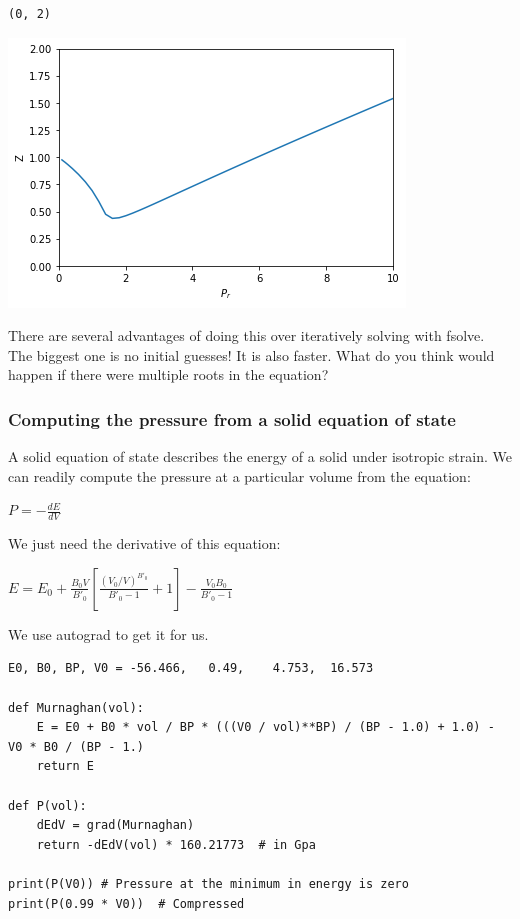 \documentclass[11pt]{article}
\begin{document}
\begin{verbatim}
(0, 2)
\end{verbatim}



\begin{center}
\includegraphics[width=.9\linewidth]{obipy-resources/bedd9c33d1d348d762ec8e845109beab-22007ycS.png}
\end{center}

There are several advantages of doing this over iteratively solving with fsolve. The biggest one is no initial guesses! It is also faster. What do you think would happen if there were multiple roots in the equation?

\subsubsection{Computing the pressure from a solid equation of state}
\label{sec:org2e2e1e0}

A solid equation of state describes the energy of a solid under isotropic strain. We can readily compute the pressure at a particular volume from the equation:

\(P = -\frac{dE}{dV}\)

We just need the derivative of this equation:

\(E = E_0+\frac{B_0 V}{B'_0}\left[\frac{(V_0/V)^{B'_0}}{B'_0-1}+1\right]-\frac{V_0 B_0}{B'_0-1}\)

We use autograd to get it for us.

\begin{verbatim}
E0, B0, BP, V0 = -56.466,   0.49,    4.753,  16.573

def Murnaghan(vol):
    E = E0 + B0 * vol / BP * (((V0 / vol)**BP) / (BP - 1.0) + 1.0) - V0 * B0 / (BP - 1.)
    return E

def P(vol):
    dEdV = grad(Murnaghan)
    return -dEdV(vol) * 160.21773  # in Gpa

print(P(V0)) # Pressure at the minimum in energy is zero
print(P(0.99 * V0))  # Compressed
\end{verbatim}
\end{document}
